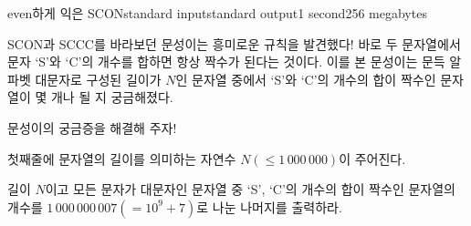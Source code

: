 \begin{problem}{even하게 익은 SCON}{standard input}{standard output}{1 second}{256 megabytes}

SCON과 SCCC를 바라보던 문성이는 흥미로운 규칙을 발견했다! 바로 두 문자열에서 문자 `S'와 `C'의 개수를 합하면 항상 짝수가 된다는 것이다. 이를 본 문성이는 문득 알파벳 대문자로 구성된 길이가 $N$인 문자열 중에서 `S'와 `C'의 개수의 합이 짝수인 문자열이 몇 개나 될 지 궁금해졌다.

문성이의 궁금증을 해결해 주자!

\InputFile
첫째줄에 문자열의 길이를 의미하는 자연수 $N(\le 1\,000\,000)$이 주어진다.

\OutputFile
길이 $N$이고 모든 문자가 대문자인 문자열 중 `S', `C'의 개수의 합이 짝수인 문자열의 개수를 $1\,000\,000\,007(=10^9+7)$로 나눈 나머지를 출력하라.

\Examples

\begin{example}
%
%
\end{example}

\end{problem}

